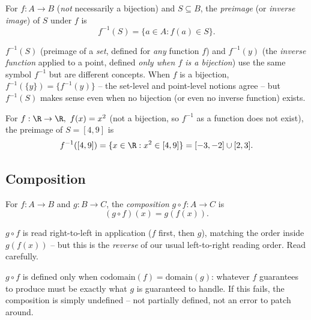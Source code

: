 \begin{definition}
For $f: A \to B$ (\emph{not} necessarily a bijection) and $S \subseteq B$, the \emph{preimage} (or \emph{inverse image}) of $S$ under $f$ is
\[
f^{-1}(S) = \{a \in A : f(a) \in S\}.
\]
\end{definition}

\begin{note}
$f^{-1}(S)$ (preimage of a \emph{set}, defined for \emph{any} function $f$) and $f^{-1}(y)$ (the \emph{inverse function} applied to a point, defined \emph{only when $f$ is a bijection}) use the same symbol $f^{-1}$ but are different concepts. When $f$ is a bijection, $f^{-1}(\{y\}) = \{f^{-1}(y)\}$ -- the set-level and point-level notions agree -- but $f^{-1}(S)$ makes sense even when no bijection (or even no inverse function) exists.
\end{note}

\begin{example}
For $f: \R \to \R,\ f(x) = x^2$ (not a bijection, so $f^{-1}$ as a function does not exist), the preimage of $S = [4,9]$ is
\[
f^{-1}([4,9]) = \{x \in \R : x^2 \in [4,9]\} = [-3,-2] \cup [2,3].
\]
\end{example}

\subsection{Composition}
\label{sec:2-9}

\begin{definition}[Composition]
For $f: A \to B$ and $g: B \to C$, the \emph{composition} $g \circ f : A \to C$ is
\[
(g \circ f)(x) = g(f(x)).
\]
\end{definition}

\begin{note}
$g \circ f$ is read right-to-left in application ($f$ first, then $g$), matching the order inside $g(f(x))$ -- but this is the \emph{reverse} of our usual left-to-right reading order. Read carefully.
\end{note}

\begin{note}
$g \circ f$ is defined only when $\mathrm{codomain}(f) = \mathrm{domain}(g)$: whatever $f$ guarantees to produce must be exactly what $g$ is guaranteed to handle. If this fails, the composition is simply undefined -- not partially defined, not an error to patch around.
\end{note}

